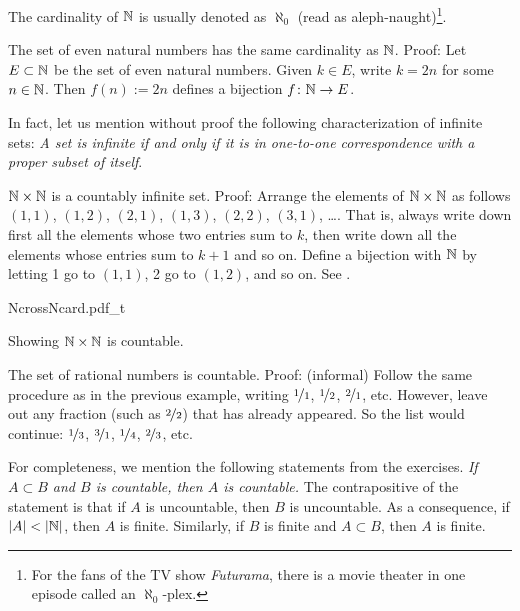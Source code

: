 The cardinality of ${\mathbb{N}}$ is usually denoted as
$\aleph_0$ (read as aleph-naught)\footnote{For the fans of the TV show
\emph{Futurama}, there is a movie theater in one episode
called an $\aleph_0$-plex.}.

\begin{example}
The set of even natural numbers has the same cardinality as ${\mathbb{N}}$.  Proof:
Let $E \subset {\mathbb{N}}$ be the set of even natural numbers.
Given $k \in E$, write $k=2n$ for some $n \in {\mathbb{N}}$.
Then $f(n) := 2n$ defines a bijection $f \colon {\mathbb{N}} \to E$.
\end{example}

In fact, let us mention without proof the following characterization
of infinite sets: \emph{A set is infinite if and only if it is in one-to-one
correspondence with a proper subset of itself}.

\begin{example}
${\mathbb{N}} \times {\mathbb{N}}$ is a countably infinite set.  Proof: Arrange the
elements of ${\mathbb{N}} \times {\mathbb{N}}$ as follows
$(1,1)$, $(1,2)$, $(2,1)$, $(1,3)$, $(2,2)$, $(3,1)$, \ldots.  That is,
always write down first all the elements whose two entries sum to $k$,
then write down all the elements whose entries sum to $k+1$ and so on.
Define a bijection with ${\mathbb{N}}$ by letting 1 go to $(1,1)$,
2 go to $(1,2)$, and so on.  See .
\begin{myfigureht}
{NcrossNcard.pdf_t}
\caption{Showing ${\mathbb{N}} \times {\mathbb{N}}$ is countable.\label{fig:NcrossNcard}}
\end{myfigureht}
\end{example}

\begin{example}
The set of rational numbers is countable.  Proof: (informal)
Follow the same procedure
as in the previous example, writing
$\nicefrac{1}{1}$, $\nicefrac{1}{2}$, $\nicefrac{2}{1}$, etc.  However,
leave out any fraction (such as $\nicefrac{2}{2}$)
that has already appeared.  So the list would continue:
$\nicefrac{1}{3}$, $\nicefrac{3}{1}$, $\nicefrac{1}{4}$,
$\nicefrac{2}{3}$, etc.
\end{example}

For completeness, we mention the following statements
from the exercises.
\emph{If $A \subset
B$ and $B$ is countable, then $A$ is countable.}  The contrapositive of the
statement is that if $A$ is
uncountable, then $B$ is uncountable.
As a consequence, if $\left\lvert {A} \right\rvert < \left\lvert {{\mathbb{N}}} \right\rvert$, then $A$ is
finite.
Similarly, if $B$ is finite and $A \subset B$, then $A$ is finite.

